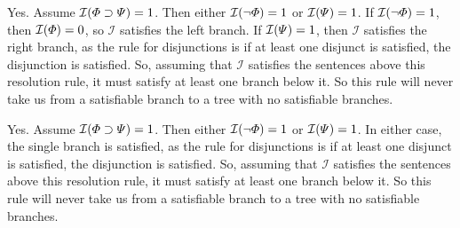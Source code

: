 \begin{earg}
%

\item Yes. Assume $\mathcal{I}(\varPhi{}\supset\varPsi{})=1$. Then either $\mathcal{I}(\neg\varPhi{})=1$ or $\mathcal{I}(\varPsi{})=1$. If $\mathcal{I}(\neg\varPhi{})=1$, then $\mathcal{I}(\varPhi{})=0$, so $\mathcal{I}$ satisfies the left branch. If $\mathcal{I}(\varPsi{})=1$, then $\mathcal{I}$ satisfies the right branch, as the rule for disjunctions is if at least one disjunct is satisfied, the disjunction is satisfied. So, assuming that $\mathcal{I}$ satisfies the sentences above this resolution rule, it must satisfy at least one branch below it. So this rule will never take us from a satisfiable branch to a tree with no satisfiable branches.

%

\item Yes. Assume $\mathcal{I}(\varPhi{}\supset\varPsi{})=1$. Then either $\mathcal{I}(\neg\varPhi{})=1$ or $\mathcal{I}(\varPsi{})=1$. In either case, the single branch is satisfied, as the rule for disjunctions is if at least one disjunct is satisfied, the disjunction is satisfied. So, assuming that $\mathcal{I}$ satisfies the sentences above this resolution rule, it must satisfy at least one branch below it. So this rule will never take us from a satisfiable branch to a tree with no satisfiable branches.

%



\end{earg}
